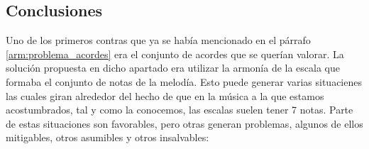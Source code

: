 \subsection{Conclusiones} 

    Uno de los primeros contras que ya se había mencionado en el párrafo \ref{arm:problema_acordes} era el conjunto de acordes que se querían valorar. La solución propuesta en dicho apartado era utilizar la armonía de la escala que formaba el conjunto de notas de la melodía. Esto puede generar varias situacienes las cuales giran alrededor del hecho de que en la música a la que estamos acostumbrados, tal y como la conocemos, las escalas suelen tener 7 notas. Parte de estas situaciones son favorables, pero otras generan problemas, algunos de ellos mitigables, otros asumibles y otros insalvables:

